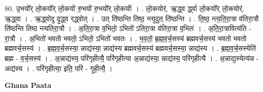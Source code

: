 \documentclass[17pt]{extarticle}
\begin{document}
80. उ॒भयो᳚र् लो॒कयो᳚र् लो॒कयो॑ रु॒भयो॑ रु॒भयो᳚र् लो॒कयोः᳚ । . लो॒कयोर्॑. ऋ॒द्ध्व र्द्ध्वा लो॒कयो᳚र् लो॒कयोर्॑. ऋ॒द्ध्वा । . ऋ॒द्ध्वोदु दृ॒द्ध्व र्‌द्ध्वोत् । . उत् ति॑ष्ठन्ति तिष्ठ॒ न्त्युदुत् ति॑ष्ठन्ति । . ति॒ष्ठ॒ न्त्य॒ति॒रा॒त्रा व॑तिरा॒त्रौ ति॑ष्ठन्ति तिष्ठ न्त्यतिरा॒त्रौ । . अ॒ति॒रा॒त्रा व॒भितो॒ ऽभितो॑ ऽतिरा॒त्रा व॑तिरा॒त्रा व॒भितः॑ । . अ॒ति॒रा॒त्रावित्य॑ति - रा॒त्रौ । . अ॒भितो॑ भवतो भवतो॒ ऽभितो॒ ऽभितो॑ भवतः । . भ॒व॒तो॒ ब्र॒ह्म॒व॒र्च॒सस्य॑ ब्रह्मवर्च॒सस्य॑ भवतो भवतो ब्रह्मवर्च॒सस्य॑ । . ब्र॒ह्म॒व॒र्च॒सस्या॒ न्नाद्य॑स्या॒ न्नाद्य॑स्य ब्रह्मवर्च॒सस्य॑ ब्रह्मवर्च॒सस्या॒ न्नाद्य॑स्य । . ब्र॒ह्म॒व॒र्च॒सस्येति॑ ब्रह्म - व॒र्च॒सस्य॑ । . अ॒न्नाद्य॑स्य॒ परि॑गृहीत्यै॒ परि॑गृहीत्या अ॒न्नाद्य॑स्या॒ न्नाद्य॑स्य॒ परि॑गृहीत्यै । . अ॒न्नाद्य॒स्येत्य॑न्न - अद्य॑स्य । . परि॑गृहीत्या॒ इति॒ परि॑ - गृ॒ही॒त्यै॒ । \newline

\textbf{Ghana Paata } \newline
\end{document}
